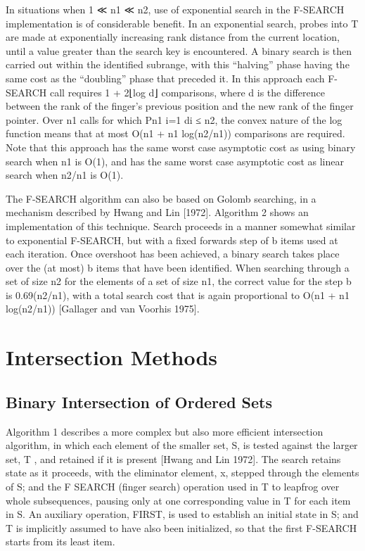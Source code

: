 \documentclass[paper=a4, fontsize=11pt]{scrartcl} %
\numberwithin{equation}{section} %
\numberwithin{figure}{section} %
\numberwithin{table}{section} %
\begin{document}
In situations when 1 ≪ n1 ≪ n2, use of exponential search in the F-SEARCH implementation
is of considerable benefit. In an exponential search, probes into T are made at exponentially increasing rank distance from the current location, until a value greater than the search key is encountered. A binary search is then carried out within the identified subrange, with this “halving” phase having the same cost as the “doubling” phase that preceded it. In this approach each F-SEARCH call requires 1 + 2⌊log d⌋ comparisons, where d is the difference between the rank of the finger’s previous position and the new rank of the finger pointer. Over n1 calls for which Pn1 i=1 di ≤ n2, the convex nature of the log function means that at most O(n1 + n1 log(n2/n1)) comparisons are required. Note that
this approach has the same worst case asymptotic cost as using binary search when n1 is O(1), and has the same worst case asymptotic cost as linear search when n2/n1 is O(1).
\linebreak

The F-SEARCH algorithm can also be based on Golomb searching, in a mechanism described by Hwang and Lin [1972]. Algorithm 2 shows an implementation of this technique. Search proceeds in a manner somewhat similar to exponential F-SEARCH, but with a fixed forwards step of b items used at each iteration. Once overshoot has been achieved, a binary search takes place over the (at most) b items that have been identified. When searching
through a set of size n2 for the elements of a set of size n1, the correct value for the step b is 0.69(n2/n1), with a total search cost that is again proportional to O(n1 + n1 log(n2/n1)) [Gallager and van Voorhis 1975].


\section{Intersection Methods}

\subsection{Binary Intersection of Ordered Sets}
Algorithm 1 describes a more complex but also more efficient intersection algorithm, in which each element of the smaller set, S, is tested against the larger set, T , and retained if it is present [Hwang and Lin 1972]. The search retains state as it proceeds, with the eliminator element, x, stepped through the elements of S; and the F SEARCH (finger search) operation used in T to leapfrog over whole subsequences, pausing only at one corresponding value in T for each item in S. An auxiliary operation, FIRST, is used to establish an initial state in S; and T is implicitly assumed to have also been initialized, so that the first F-SEARCH starts from its least item.
\end{document}
